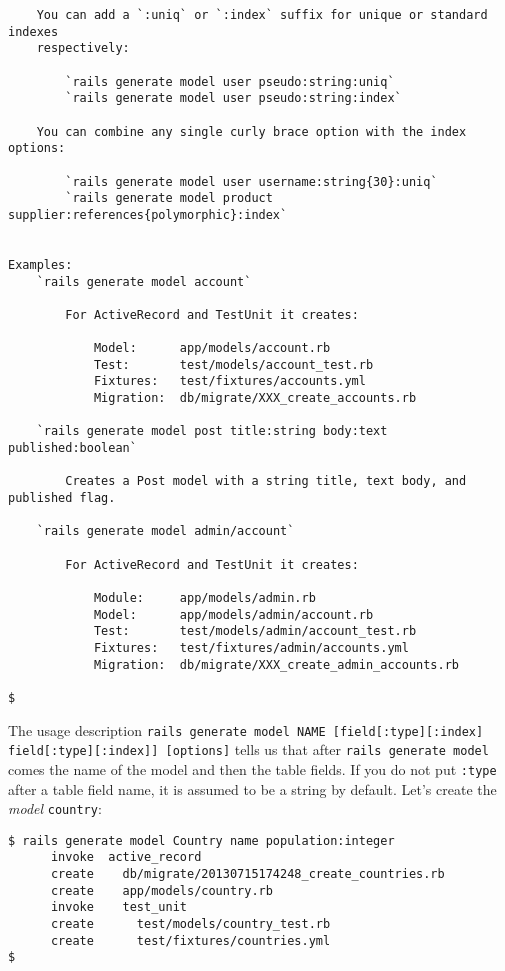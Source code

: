 \documentclass[a4paper]{book}
\newcounter{tab}[chapter]
\begin{document}
\begin{shaded}
\begin{verbatim}
    You can add a `:uniq` or `:index` suffix for unique or standard indexes
    respectively:

        `rails generate model user pseudo:string:uniq`
        `rails generate model user pseudo:string:index`

    You can combine any single curly brace option with the index options:

        `rails generate model user username:string{30}:uniq`
        `rails generate model product supplier:references{polymorphic}:index`


Examples:
    `rails generate model account`

        For ActiveRecord and TestUnit it creates:

            Model:      app/models/account.rb
            Test:       test/models/account_test.rb
            Fixtures:   test/fixtures/accounts.yml
            Migration:  db/migrate/XXX_create_accounts.rb

    `rails generate model post title:string body:text published:boolean`

        Creates a Post model with a string title, text body, and published flag.

    `rails generate model admin/account`

        For ActiveRecord and TestUnit it creates:

            Module:     app/models/admin.rb
            Model:      app/models/admin/account.rb
            Test:       test/models/admin/account_test.rb
            Fixtures:   test/fixtures/admin/accounts.yml
            Migration:  db/migrate/XXX_create_admin_accounts.rb

$
\end{verbatim}\end{shaded}

The usage description \texttt{rails generate model NAME   {[}field{[}:type{]}{[}:index{]} field{[}:type{]}{[}:index{]}{]} {[}options{]}} tells us that after \texttt{rails generate model} comes the name of the model and then the table fields. If you do not put \texttt{:type} after a table field name, it is assumed to be a string by default. Let's create the \emph{model} \texttt{country}:

\begin{shaded}\begin{verbatim}
$ rails generate model Country name population:integer
      invoke  active_record
      create    db/migrate/20130715174248_create_countries.rb
      create    app/models/country.rb
      invoke    test_unit
      create      test/models/country_test.rb
      create      test/fixtures/countries.yml
$
\end{verbatim}\end{shaded}
\end{document}
